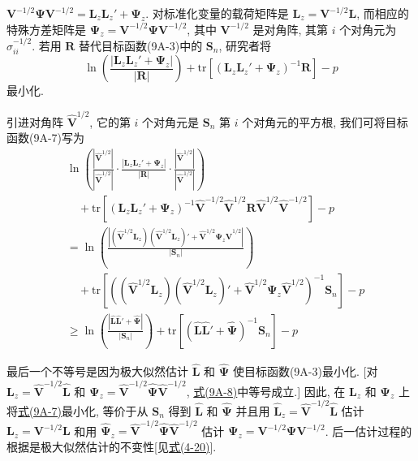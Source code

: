 
$\mathbf{V}^{-1/2}\boldsymbol{\Psi}\mathbf{V}^{-1/2}=\mathbf{L}_z\mathbf{L}_z'+\boldsymbol{\Psi}_z$. 对标准化变量的载荷矩阵是 $\mathbf{L}_z=\mathbf{V}^{-1/2}\mathbf{L}$, 而相应的特殊方差矩阵是 $\boldsymbol{\Psi}_z=\mathbf{V}^{-1/2}\boldsymbol{\Psi}\mathbf{V}^{-1/2}$, 其中 $\mathbf{V}^{-1/2}$ 是对角阵, 其第 $i$ 个对角元为 $\sigma_{ii}^{-1/2}$. 若用 $\mathbf{R}$ 替代目标函数(9A-3)中的 $\mathbf{S}_n$, 研究者将
\label{eq:9A-7}
\begin{equation}
\ln\left(\frac{|\mathbf{L}_z\mathbf{L}_z'+\boldsymbol{\Psi}_z|}{|\mathbf{R}|}\right)+\mathrm{tr}[(\mathbf{L}_z\mathbf{L}_z'+\boldsymbol{\Psi}_z)^{-1}\mathbf{R}]-p \tag{9A-7}
\end{equation}
最小化.

引进对角阵 $\hat{\mathbf{V}}^{1/2}$, 它的第 $i$ 个对角元是 $\mathbf{S}_n$ 第 $i$ 个对角元的平方根, 我们可将目标函数(9A-7)写为
\label{eq:9A-8}
\begin{equation}
\begin{aligned}
&\ln\left(\frac{|\hat{\mathbf{V}}^{1/2}|}{|\hat{\mathbf{V}}^{1/2}|}\cdot\frac{|\mathbf{L}_z\mathbf{L}_z'+\boldsymbol{\Psi}_z|}{|\mathbf{R}|}\cdot\frac{|\hat{\mathbf{V}}^{1/2}|}{|\hat{\mathbf{V}}^{1/2}|}\right)\\
&\quad+\mathrm{tr}[(\mathbf{L}_z\mathbf{L}_z'+\boldsymbol{\Psi}_z)^{-1}\hat{\mathbf{V}}^{-1/2}\hat{\mathbf{V}}^{1/2}\mathbf{R}\hat{\mathbf{V}}^{1/2}\hat{\mathbf{V}}^{-1/2}]-p\\
&=\ln\left(\frac{|(\hat{\mathbf{V}}^{1/2}\mathbf{L}_z)(\hat{\mathbf{V}}^{1/2}\mathbf{L}_z)'+\hat{\mathbf{V}}^{1/2}\boldsymbol{\Psi}_z\hat{\mathbf{V}}^{1/2}|}{|\mathbf{S}_n|}\right)\\
&\quad+\mathrm{tr}[((\hat{\mathbf{V}}^{1/2}\mathbf{L}_z)(\hat{\mathbf{V}}^{1/2}\mathbf{L}_z)'+\hat{\mathbf{V}}^{1/2}\boldsymbol{\Psi}_z\hat{\mathbf{V}}^{1/2})^{-1}\mathbf{S}_n]-p\\
&\geqslant\ln\left(\frac{|\hat{\mathbf{L}}\hat{\mathbf{L}}'+\hat{\boldsymbol{\Psi}}|}{|\mathbf{S}_n|}\right)+\mathrm{tr}[(\hat{\mathbf{L}}\hat{\mathbf{L}}'+\hat{\boldsymbol{\Psi}})^{-1}\mathbf{S}_n]-p
\end{aligned} \tag{9A-8}
\end{equation}

最后一个不等号是因为极大似然估计 $\hat{\mathbf{L}}$ 和 $\hat{\boldsymbol{\Psi}}$ 使目标函数(9A-3)最小化. [对 $\mathbf{L}_z=\hat{\mathbf{V}}^{-1/2}\hat{\mathbf{L}}$ 和 $\boldsymbol{\Psi}_z=\hat{\mathbf{V}}^{-1/2}\hat{\boldsymbol{\Psi}}\hat{\mathbf{V}}^{-1/2}$, \hyperref[eq:9A-8]{式(9A-8)}中等号成立.] 因此, 在 $\mathbf{L}_z$ 和 $\boldsymbol{\Psi}_z$ 上将\hyperref[eq:9A-7]{式(9A-7)}最小化, 等价于从 $\mathbf{S}_n$ 得到 $\hat{\mathbf{L}}$ 和 $\hat{\boldsymbol{\Psi}}$ 并且用 $\hat{\mathbf{L}}_z=\hat{\mathbf{V}}^{-1/2}\hat{\mathbf{L}}$ 估计 $\mathbf{L}_z=\mathbf{V}^{-1/2}\mathbf{L}$ 和用 $\hat{\boldsymbol{\Psi}}_z=\hat{\mathbf{V}}^{-1/2}\hat{\boldsymbol{\Psi}}\hat{\mathbf{V}}^{-1/2}$ 估计 $\boldsymbol{\Psi}_z=\mathbf{V}^{-1/2}\boldsymbol{\Psi}\mathbf{V}^{-1/2}$. 后一估计过程的根据是极大似然估计的不变性[见\hyperref[eq:4-20]{式(4-20)}].

